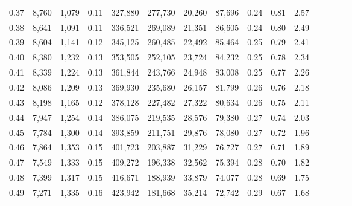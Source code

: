 \begin{tabular}{rrrcrrrrrrrrrrr}
0.37 &   8,760 &  1,079 &                                       0.11 &  327,880 &  277,730 &   20,260 &   87,696 &  0.24 &  0.81 &                         2.57 \\
0.38 &   8,641 &  1,091 &                                       0.11 &  336,521 &  269,089 &   21,351 &   86,605 &  0.24 &  0.80 &                         2.49 \\
0.39 &   8,604 &  1,141 &                                       0.12 &  345,125 &  260,485 &   22,492 &   85,464 &  0.25 &  0.79 &                         2.41 \\
0.40 &   8,380 &  1,232 &                                       0.13 &  353,505 &  252,105 &   23,724 &   84,232 &  0.25 &  0.78 &                         2.34 \\
0.41 &   8,339 &  1,224 &                                       0.13 &  361,844 &  243,766 &   24,948 &   83,008 &  0.25 &  0.77 &                         2.26 \\
0.42 &   8,086 &  1,209 &                                       0.13 &  369,930 &  235,680 &   26,157 &   81,799 &  0.26 &  0.76 &                         2.18 \\
0.43 &   8,198 &  1,165 &                                       0.12 &  378,128 &  227,482 &   27,322 &   80,634 &  0.26 &  0.75 &                         2.11 \\
0.44 &   7,947 &  1,254 &                                       0.14 &  386,075 &  219,535 &   28,576 &   79,380 &  0.27 &  0.74 &                         2.03 \\
0.45 &   7,784 &  1,300 &                                       0.14 &  393,859 &  211,751 &   29,876 &   78,080 &  0.27 &  0.72 &                         1.96 \\
0.46 &   7,864 &  1,353 &                                       0.15 &  401,723 &  203,887 &   31,229 &   76,727 &  0.27 &  0.71 &                         1.89 \\
0.47 &   7,549 &  1,333 &                                       0.15 &  409,272 &  196,338 &   32,562 &   75,394 &  0.28 &  0.70 &                         1.82 \\
0.48 &   7,399 &  1,317 &                                       0.15 &  416,671 &  188,939 &   33,879 &   74,077 &  0.28 &  0.69 &                         1.75 \\
0.49 &   7,271 &  1,335 &                                       0.16 &  423,942 &  181,668 &   35,214 &   72,742 &  0.29 &  0.67 &                         1.68 \\

\end{tabular}
